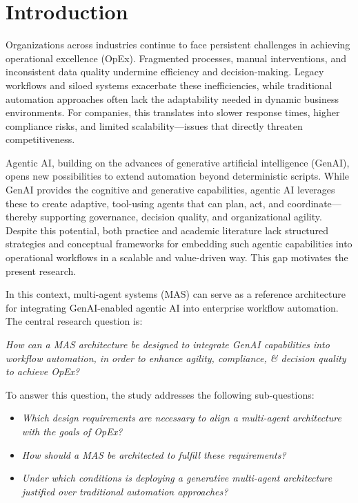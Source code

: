 \section{Introduction}\label{sec:intro} %
Organizations across industries continue to face persistent challenges in achieving operational excellence (OpEx). Fragmented processes, manual interventions, and inconsistent data quality undermine efficiency and decision-making. Legacy workflows and siloed systems exacerbate these inefficiencies, while traditional automation approaches often lack the adaptability needed in dynamic business environments. For companies, this translates into slower response times, higher compliance risks, and limited scalability—issues that directly threaten competitiveness.

Agentic AI, building on the advances of generative artificial intelligence (GenAI), opens new possibilities to extend automation beyond deterministic scripts. While GenAI provides the cognitive and generative capabilities, agentic AI leverages these to create adaptive, tool-using agents that can plan, act, and coordinate---thereby supporting governance, decision quality, and organizational agility. Despite this potential, both practice and academic literature lack structured strategies and conceptual frameworks for embedding such agentic capabilities into operational workflows in a scalable and value-driven way. This gap motivates the present research.

In this context, multi-agent systems (MAS) can serve as a reference architecture for integrating GenAI-enabled agentic AI into enterprise workflow automation. The central research question is:

\vspace{0.5\baselineskip}
\emph{How can a MAS architecture be designed to integrate GenAI capabilities into workflow automation, in order to enhance agility, compliance, \& decision quality to achieve OpEx?}
\vspace{0.5\baselineskip}

To answer this question, the study addresses the following sub-questions:
\begin{itemize}
    \item \emph{Which design requirements are necessary to align a multi-agent architecture with the goals of OpEx?}
    \item \emph{How should a MAS be architected to fulfill these requirements?}
    \item \emph{Under which conditions is deploying a generative multi-agent architecture justified over traditional automation approaches?}
\end{itemize}

